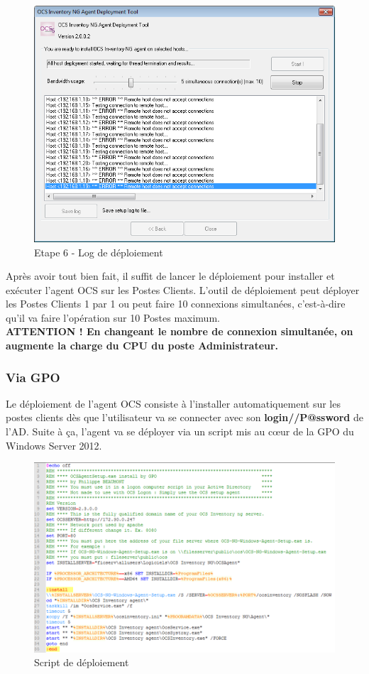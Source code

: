 \documentclass[11pt,a4paper,oneside]{article}
\begin{document}
\begin{figure}[hbtp]
\centering
\includegraphics[scale=0.6]{Script/6.png}
\caption{Etape 6 - Log de déploiement}
\end{figure}

Après avoir tout bien fait, il suffit de lancer le déploiement pour installer et exécuter l'agent OCS sur les Postes Clients. L'outil de déploiement peut déployer les Postes Clients 1 par 1 ou peut faire 10 connexions simultanées, c'est-à-dire qu'il va faire l'opération sur 10 Postes maximum. \\ 
\textbf{ATTENTION ! En changeant le nombre de connexion simultanée, on augmente la charge du CPU du poste Administrateur.}
\newpage
\subsubsection{Via GPO}
Le déploiement de l'agent OCS consiste à l'installer automatiquement sur les postes clients dès que l'utilisateur va se connecter avec son \textbf{login//P@ssword} de l'AD. Suite à ça, l'agent va se déployer via un script mis au c\oe{}ur de la GPO du Windows Server 2012.
\\
\begin{figure}[hbtp]
\centering
\includegraphics[scale=0.7]{Script/DeploiementGPO1.PNG}
\caption{Script de déploiement}
\end{figure}
\end{document}
